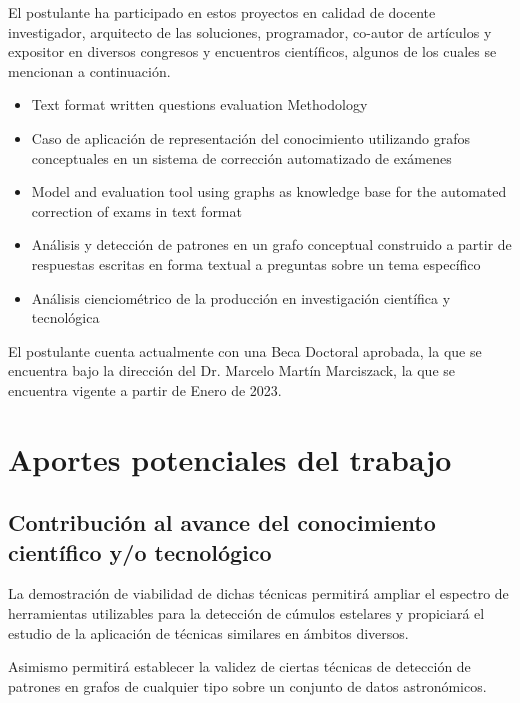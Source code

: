 \documentclass[
	11pt,oneside,a4paper,
	headsepline,footsepline,
	fleqn,
]{memoir}
\begin{document}
El postulante ha participado en estos proyectos en calidad de docente investigador, arquitecto de las soluciones, programador, co-autor de artículos y expositor en diversos congresos y encuentros científicos, algunos de los cuales se mencionan a continuación.

\begin{itemize}
	\item Text format written questions evaluation Methodology\cite{Menvielle2016}
	\item Caso de aplicación de representación del conocimiento utilizando grafos conceptuales en un sistema de corrección automatizado de exámenes\cite{PazMenvielle2017}
	\item Model and evaluation tool using graphs as knowledge base for the automated correction of exams in text format\cite{Menvielle2017}
	\item Análisis y detección de patrones en un grafo conceptual construido a partir de respuestas escritas en forma textual a preguntas sobre un tema específico\cite{PazMenvielle2018}
	\item Análisis cienciométrico de la producción en investigación científica y tecnológica\cite{Munoz2020}
\end{itemize}

El postulante cuenta actualmente con una Beca Doctoral aprobada, la que se encuentra bajo la dirección del Dr. Marcelo Martín Marciszack, la que se encuentra vigente a partir de Enero de 2023.

\section{Aportes potenciales del trabajo}

\subsection{Contribución al avance del conocimiento científico y/o tecnológico}


La demostración de viabilidad de dichas técnicas permitirá ampliar el espectro de herramientas utilizables para la detección de cúmulos estelares y propiciará el estudio de la aplicación de técnicas similares en ámbitos diversos.

Asimismo permitirá establecer la validez de ciertas técnicas de detección de patrones en grafos de cualquier tipo sobre un conjunto de datos astronómicos.
\end{document}
